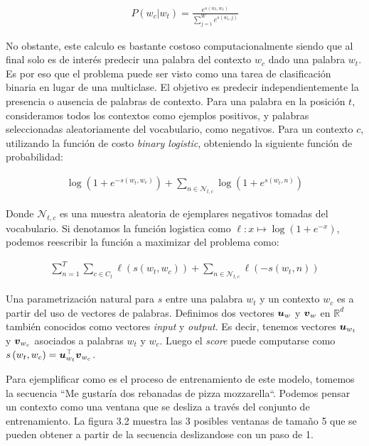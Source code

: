 \begin{align*}
    P(w_{c}|w_{t}) = \frac{e^{s(w_t, w_c)}}{\sum_{j=1}^{W} e^{s(w_t, j)}}
\end{align*}

No obstante, este calculo es bastante costoso computacionalmente siendo que al
final solo es de interés predecir una palabra del contexto $w_c$ dado una
palabra $w_t$. Es por eso que el problema puede ser visto como una tarea de
clasificación binaria en lugar de una multiclase. El objetivo es predecir
independientemente la presencia o ausencia de palabras de contexto. Para una
palabra en la posición $t$, consideramos todos los contextos como ejemplos
positivos, y palabras seleccionadas aleatoriamente del vocabulario, como
negativos. Para un contexto $c$, utilizando la función de costo \emph{binary
logistic}, obteniendo la siguiente función de probabilidad:

\begin{align*}
    \log\left( 1 + e^{-s(w_t, w_c)} \right) +
    \sum_{n \in \mathcal{N}_{t, c}} \log\left( 1 + e^{s(w_t, n)} \right)
\end{align*}

Donde $\mathcal{N}_{t, c}$ es una muestra aleatoria de ejemplares negativos
tomadas del vocabulario. Si denotamos la función logistica como $\ell: x \mapsto
\log \left(1 + e^{-x} \right)$, podemos reescribir la función a maximizar del
problema como:

\begin{align*}
    \sum_{n=1}^{T} 
        \sum_{c \in C_t} \ell\left(s(w_t, w_c)\right) +
        \sum_{n \in \mathcal{N}_{t, c}} \ell\left(-s(w_t, n) \right)
\end{align*}

Una parametrización natural para $s$ entre una palabra $w_t$ y un contexto $w_c$
es a partir del uso de vectores de palabras. Definimos dos vectores $\boldsymbol{u}_w$ y
$\boldsymbol{v}_w$ en $\mathbb{R}^d$ también conocidos como vectores \emph{input} y \emph{output}. Es
decir, tenemos vectores $\boldsymbol{u}_{w_t}$ y $\boldsymbol{v}_{w_c}$ asociados a palabras
$w_t$ y $w_c$. Luego el \emph{score} puede computarse como $s\left( w_t, w_c
\right) = \boldsymbol{u}_{w_t}^\top \boldsymbol{v}_{w_c}$.

Para ejemplificar como es el proceso de entrenamiento de este modelo, tomemos la
secuencia ``Me gustaría dos rebanadas de pizza mozzarella``. Podemos pensar un
contexto como una ventana que se desliza a través del conjunto de entrenamiento.
La figura 3.2 muestra las 3 posibles ventanas de tamaño 5 que se pueden obtener
a partir de la secuencia deslizandose con un paso de 1.

